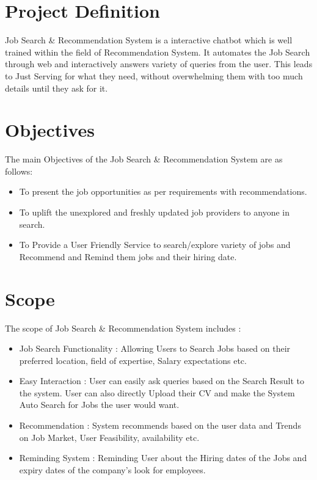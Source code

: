 \documentclass[a4paper,12pt]{report}
\begin{document}
        \section{Project Definition}
        Job Search \& Recommendation System is a interactive chatbot which is well trained within the field of Recommendation System. It automates the Job Search through web and interactively answers variety of queries from the user. This leads to Just Serving for what they need, without overwhelming them with too much details until they ask for it. 

        \section{Objectives}
        The main Objectives of the Job Search \& Recommendation System are as follows:
        \begin{itemize}
            \item To present the job opportunities as per requirements with recommendations.
            \item To uplift the unexplored and freshly updated job providers to anyone in search.
            \item To Provide a User Friendly Service to search/explore variety of jobs and Recommend and Remind them jobs and their hiring date.
            
        \end{itemize}

        \section{Scope}
        The scope of Job Search \& Recommendation System includes :
        \begin{itemize}
            \item   Job Search Functionality : Allowing Users to Search Jobs based on their preferred location, field of expertise, Salary expectations etc.
            \item Easy Interaction : User can easily ask queries based on the Search Result to the system. User can also directly Upload their CV and make the System Auto Search for Jobs the user would want.
            \item Recommendation : System recommends based on the user data and Trends on Job Market, User Feasibility, availability etc.
            \item Reminding System : Reminding User about the Hiring dates of the Jobs and expiry dates of the company’s look for employees.
        \end{itemize}
\end{document}
